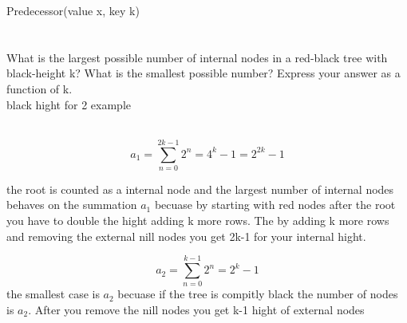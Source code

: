 \documentclass[12pt]{article}
\begin{document}
\begin{algorithm}[H]
Predecessor(value x, key k)
\end{algorithm}


 
 	\section{}
What is the largest possible number of internal nodes in a red-black tree with black-height k? What is the smallest possible number? Express your answer as a function of k.\\


black hight for 2 example\\\\

\pagebreak


 			\begin{equation}
 	 			a_1 = \sum_{n=0}^{2k-1}2^n = 4^k -1 = 2^{2k}-1
 			\end{equation} 
 			 			
the root is counted as a internal node and the largest number of internal nodes behaves on the summation $a_1$ becuase  by starting with red nodes after the root you have to double the hight adding k more rows. The by adding k more rows and removing the external nill nodes you get 2k-1 for your internal hight. 
 	

 			\begin{equation}
 	 				a_2 = \sum_{n=0}^{k-1}2^n = 2^k -1
 			\end{equation}  			
 			the smallest case is $a_2$ becuase if the tree is compitly black the number of nodes is $a_2$. After you remove the nill nodes you get k-1 hight of external nodes
\end{document}
